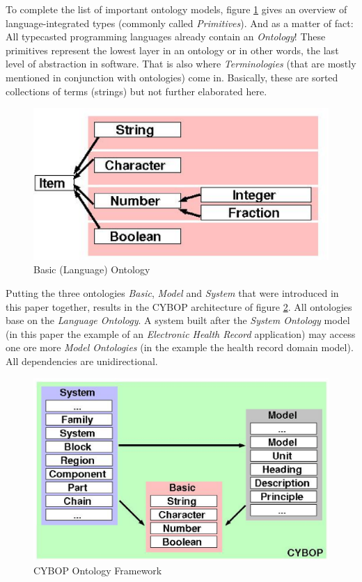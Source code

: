 To complete the list of important ontology models, figure \ref{basic_ontology_figure}
gives an overview of language-integrated types (commonly called \emph{Primitives}).
And as a matter of fact: All typecasted programming languages already contain an
\emph{Ontology}!
These primitives represent the lowest layer in an ontology or in other words, the
last level of abstraction in software. That is also where \emph{Terminologies}
(that are mostly mentioned in conjunction with ontologies) come in. Basically,
these are sorted collections of terms (strings) but not further elaborated here.

\begin{figure}[ht]
    \begin{center}
        \includegraphics[scale=0.4]{vector/basic_ontology.eps}
        \caption{Basic (Language) Ontology}
        \label{basic_ontology_figure}
    \end{center}
\end{figure}

Putting the three ontologies \emph{Basic}, \emph{Model} and \emph{System} that were
introduced in this paper together, results in the CYBOP architecture of figure
\ref{ontology_framework_figure}. All ontologies base on the \emph{Language Ontology}.
A system built after the \emph{System Ontology} model (in this paper the example
of an \emph{Electronic Health Record} application) may access one ore more
\emph{Model Ontologies} (in the example the health record domain model).
All dependencies are unidirectional.

\begin{figure}[ht]
    \begin{center}
        \includegraphics[scale=0.3]{vector/ontology_framework.eps}
        \caption{CYBOP Ontology Framework}
        \label{ontology_framework_figure}
    \end{center}
\end{figure}

